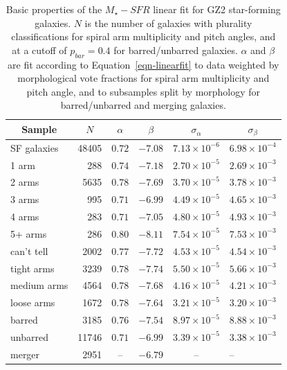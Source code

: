 \documentclass[useAMS,usenatbib]{mn2e}
\begin{document}
\begin{table} 
 \begin{tabular}{@{}lrcrcl}
 \hline
\multicolumn{1}{c}{Sample} &
\multicolumn{1}{c}{$N$} &
\multicolumn{1}{c}{$\alpha$} &
\multicolumn{1}{c}{$\beta$} &
\multicolumn{1}{c}{$\sigma_\alpha$} &
\multicolumn{1}{c}{$\sigma_\beta$} 
\\ 
\hline
\hline						
SF galaxies  & 48405  & $0.72$  & $-7.08$  &  $7.13\times10^{-6}$  & $6.98\times10^{-4}$  \\
\hline                                                                                   
1 arm        & 288    & $0.74$  & $-7.18$  &  $2.70\times10^{-5}$  & $2.69\times10^{-3}$  \\
2 arms       & 5635   & $0.78$  & $-7.69$  &  $3.70\times10^{-5}$  & $3.78\times10^{-3}$  \\
3 arms       & 995    & $0.71$  & $-6.99$  &  $4.49\times10^{-5}$  & $4.65\times10^{-3}$  \\
4 arms       & 283    & $0.71$  & $-7.05$  &  $4.80\times10^{-5}$  & $4.93\times10^{-3}$  \\
5+ arms      & 286    & $0.80$  & $-8.11$  &  $7.54\times10^{-5}$  & $7.53\times10^{-3}$  \\
can't tell   & 2002   & $0.77$  & $-7.72$  &  $4.53\times10^{-5}$  & $4.54\times10^{-3}$  \\
\hline                                                                                   
tight arms   & 3239   & $0.78$  & $-7.74$  &  $5.50\times10^{-5}$  & $5.66\times10^{-3}$  \\
medium arms  & 4564   & $0.78$  & $-7.68$  &  $4.16\times10^{-5}$  & $4.21\times10^{-3}$  \\
loose arms   & 1672   & $0.78$  & $-7.64$  &  $3.21\times10^{-5}$  & $3.20\times10^{-3}$  \\
\hline                                                                                   
barred       & 3185   & $0.76$  & $-7.54$  &  $8.97\times10^{-5}$  & $8.88\times10^{-3}$  \\
unbarred     & 11746  & $0.71$  & $-6.99$  &  $3.39\times10^{-5}$  & $3.38\times10^{-3}$  \\
\hline                                                                                   
merger       & 2951   & --      & $-6.79$  &  --                                          &      --                    \\
\hline
 \end{tabular}
\caption{Basic properties of the $M_\star-SFR$ linear fit for GZ2 star-forming galaxies. $N$ is the number of galaxies with plurality classifications for spiral arm multiplicity and pitch angles, and at a cutoff of $p_{bar}=0.4$ for barred/unbarred galaxies. $\alpha$ and $\beta$ are fit according to Equation~\ref{eqn-linearfit} to data weighted by morphological vote fractions for spiral arm multiplicity and pitch angle, and to subsamples split by morphology for barred/unbarred and merging galaxies.\label{tbl-fits}}
\end{table}
\end{document}
